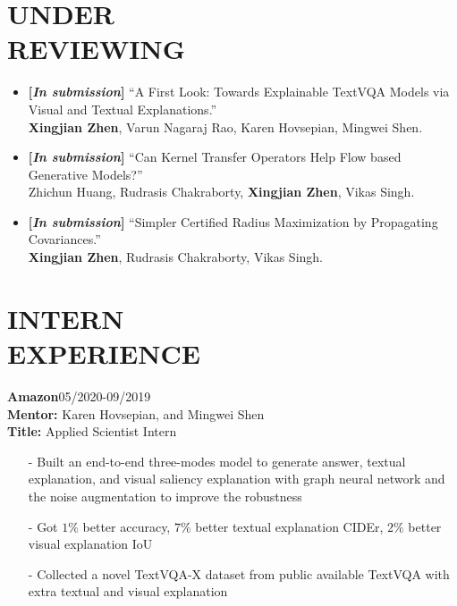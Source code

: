 \documentclass[margin]{res}
\begin{document}
\begin{resume}
\section{UNDER\\ REVIEWING}
				\begin{itemize}[noitemsep,wide=0pt,leftmargin=\dimexpr{} + 2\relax]\itemsep -0.0pt
                \item \textbf{[\emph{In submission}]} ``A First Look: Towards Explainable TextVQA Models via Visual and Textual Explanations.''\\
                            \textbf{Xingjian Zhen}, Varun Nagaraj Rao, Karen Hovsepian, Mingwei Shen.
                \item \textbf{[\emph{In submission}]} ``Can Kernel Transfer Operators Help Flow based Generative Models?''\\
                            Zhichun Huang, Rudrasis Chakraborty, \textbf{Xingjian Zhen}, Vikas Singh.
                \item \textbf{[\emph{In submission}]} ``Simpler Certified Radius Maximization by Propagating Covariances.''\\
                            \textbf{Xingjian Zhen}, Rudrasis Chakraborty, Vikas Singh.
                \end{itemize}

\vspace{-1em}
\section{INTERN \\ EXPERIENCE}
                \textbf{Amazon}\hfill 05/2020-09/2019\\
                \textbf{Mentor:} Karen Hovsepian, and Mingwei Shen\\
                \textbf{Title:} Applied Scientist Intern
                \begin{itemize}\itemsep -2.2pt %
                \item[-] Built an end-to-end three-modes model to generate answer, textual explanation, and visual saliency explanation with graph neural network and the noise augmentation to improve the robustness
                \item[-] Got $1\%$ better accuracy, $7\%$ better textual explanation CIDEr, $2\%$ better visual explanation IoU
                 \item[-] Collected a novel TextVQA-X dataset from public available TextVQA with extra textual and visual explanation
                 \end{itemize}
                 

\end{resume}
\end{document}
